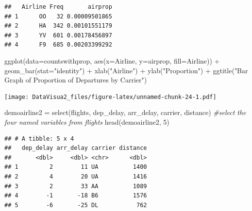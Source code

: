 \documentclass[
]{article}
\newenvironment{Shaded}{\begin{snugshade}}{\end{snugshade}}
\newcommand{\AttributeTok}[1]{\textcolor[rgb]{0.77,0.63,0.00}{#1}}
\newcommand{\CommentTok}[1]{\textcolor[rgb]{0.56,0.35,0.01}{\textit{#1}}}
\newcommand{\DecValTok}[1]{\textcolor[rgb]{0.00,0.00,0.81}{#1}}
\newcommand{\FunctionTok}[1]{\textcolor[rgb]{0.00,0.00,0.00}{#1}}
\newcommand{\NormalTok}[1]{#1}
\newcommand{\OtherTok}[1]{\textcolor[rgb]{0.56,0.35,0.01}{#1}}
\newcommand{\SpecialCharTok}[1]{\textcolor[rgb]{0.00,0.00,0.00}{#1}}
\newcommand{\StringTok}[1]{\textcolor[rgb]{0.31,0.60,0.02}{#1}}
\begin{document}
\begin{verbatim}
##   Airline Freq       airprop
## 1      OO   32 0.00009501865
## 2      HA  342 0.00101551179
## 3      YV  601 0.00178456897
## 4      F9  685 0.00203399292
\end{verbatim}

\begin{Shaded}
\begin{Highlighting}[]
\FunctionTok{ggplot}\NormalTok{(}\AttributeTok{data=}\NormalTok{countswithprop, }\FunctionTok{aes}\NormalTok{(}\AttributeTok{x=}\NormalTok{Airline, }\AttributeTok{y=}\NormalTok{airprop, }\AttributeTok{fill=}\NormalTok{Airline)) }\SpecialCharTok{+} \FunctionTok{geom\_bar}\NormalTok{(}\AttributeTok{stat=}\StringTok{"identity"}\NormalTok{) }\SpecialCharTok{+} \FunctionTok{xlab}\NormalTok{(}\StringTok{"Airline"}\NormalTok{) }\SpecialCharTok{+} \FunctionTok{ylab}\NormalTok{(}\StringTok{"Proportion"}\NormalTok{) }\SpecialCharTok{+} \FunctionTok{ggtitle}\NormalTok{(}\StringTok{"Bar Graph of Proportion of Departures by Carrier"}\NormalTok{)}
\end{Highlighting}
\end{Shaded}

\texttt{[image: DataVisua2\_files/figure-latex/unnamed-chunk-24-1.pdf]}

\begin{Shaded}
\begin{Highlighting}[]
\NormalTok{demoairline2 }\OtherTok{=} \FunctionTok{select}\NormalTok{(flights, dep\_delay, arr\_delay, carrier, distance) }\CommentTok{\#select the four named variables from flights}
\FunctionTok{head}\NormalTok{(demoairline2, }\DecValTok{5}\NormalTok{)}
\end{Highlighting}
\end{Shaded}

\begin{verbatim}
## # A tibble: 5 x 4
##   dep_delay arr_delay carrier distance
##       <dbl>     <dbl> <chr>      <dbl>
## 1         2        11 UA          1400
## 2         4        20 UA          1416
## 3         2        33 AA          1089
## 4        -1       -18 B6          1576
## 5        -6       -25 DL           762
\end{verbatim}
\end{document}
